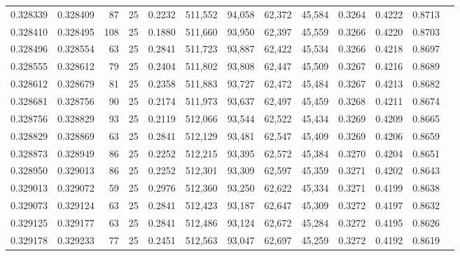 \begin{tabular}{rrrrrrrrrrrrr}
0.328339 & 0.328409 &    87 &  25 &                                     0.2232 & 511,552 &  94,058 &  62,372 &  45,584 & 0.3264 & 0.4222 & 0.8713 \\
0.328410 & 0.328495 &   108 &  25 &                                     0.1880 & 511,660 &  93,950 &  62,397 &  45,559 & 0.3266 & 0.4220 & 0.8703 \\
0.328496 & 0.328554 &    63 &  25 &                                     0.2841 & 511,723 &  93,887 &  62,422 &  45,534 & 0.3266 & 0.4218 & 0.8697 \\
0.328555 & 0.328612 &    79 &  25 &                                     0.2404 & 511,802 &  93,808 &  62,447 &  45,509 & 0.3267 & 0.4216 & 0.8689 \\
0.328612 & 0.328679 &    81 &  25 &                                     0.2358 & 511,883 &  93,727 &  62,472 &  45,484 & 0.3267 & 0.4213 & 0.8682 \\
0.328681 & 0.328756 &    90 &  25 &                                     0.2174 & 511,973 &  93,637 &  62,497 &  45,459 & 0.3268 & 0.4211 & 0.8674 \\
0.328756 & 0.328829 &    93 &  25 &                                     0.2119 & 512,066 &  93,544 &  62,522 &  45,434 & 0.3269 & 0.4209 & 0.8665 \\
0.328829 & 0.328869 &    63 &  25 &                                     0.2841 & 512,129 &  93,481 &  62,547 &  45,409 & 0.3269 & 0.4206 & 0.8659 \\
0.328873 & 0.328949 &    86 &  25 &                                     0.2252 & 512,215 &  93,395 &  62,572 &  45,384 & 0.3270 & 0.4204 & 0.8651 \\
0.328950 & 0.329013 &    86 &  25 &                                     0.2252 & 512,301 &  93,309 &  62,597 &  45,359 & 0.3271 & 0.4202 & 0.8643 \\
0.329013 & 0.329072 &    59 &  25 &                                     0.2976 & 512,360 &  93,250 &  62,622 &  45,334 & 0.3271 & 0.4199 & 0.8638 \\
0.329073 & 0.329124 &    63 &  25 &                                     0.2841 & 512,423 &  93,187 &  62,647 &  45,309 & 0.3272 & 0.4197 & 0.8632 \\
0.329125 & 0.329177 &    63 &  25 &                                     0.2841 & 512,486 &  93,124 &  62,672 &  45,284 & 0.3272 & 0.4195 & 0.8626 \\
0.329178 & 0.329233 &    77 &  25 &                                     0.2451 & 512,563 &  93,047 &  62,697 &  45,259 & 0.3272 & 0.4192 & 0.8619 \\

\end{tabular}
